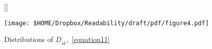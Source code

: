 \begin{figure}
	
	[\FBwidth]
	{
		\caption{Distributions of \(\underline D_{ik}\),~\autoref{equation11}}\label{figure4}
	}
	{
		\texttt{[image: \$HOME/Dropbox/Readability/draft/pdf/figure4.pdf]}
	}
\end{figure}